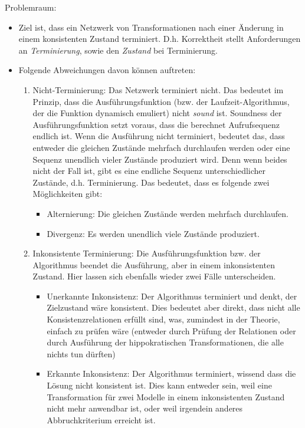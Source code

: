 Problemraum:
\begin{itemize}
    \item Ziel ist, dass ein Netzwerk von Transformationen nach einer Änderung in einem konsistenten Zustand terminiert. D.h. Korrektheit stellt Anforderungen an \emph{Terminierung}, sowie den \emph{Zustand} bei Terminierung.
    \item Folgende Abweichungen davon können auftreten:
    \begin{enumerate}
        \item Nicht-Terminierung: Das Netzwerk terminiert nicht. Das bedeutet im Prinzip, dass die Ausführungsfunktion (bzw. der Laufzeit-Algorithmus, der die Funktion dynamisch emuliert) nicht \emph{sound} ist. Soundness der Ausführungsfunktion setzt voraus, dass die berechnet Aufrufsequenz endlich ist. Wenn die Ausführung nicht terminiert, bedeutet das, dass entweder die gleichen Zustände mehrfach durchlaufen werden oder eine Sequenz unendlich vieler Zustände produziert wird. Denn wenn beides nicht der Fall ist, gibt es eine endliche Sequenz unterschiedlicher Zustände, d.h. Terminierung. Das bedeutet, dass es folgende zwei Möglichkeiten gibt:
        \begin{itemize}
            \item Alternierung: Die gleichen Zustände werden mehrfach durchlaufen.
            \item Divergenz: Es werden unendlich viele Zustände produziert.
        \end{itemize}
        \item Inkonsistente Terminierung: Die Ausführungsfunktion bzw. der Algorithmus beendet die Ausführung, aber in einem inkonsistenten Zustand. Hier lassen sich ebenfalls wieder zwei Fälle unterscheiden.
        \begin{itemize}
            \item Unerkannte Inkonsistenz: Der Algorithmus terminiert und denkt, der Zielzustand wäre konsistent. Dies bedeutet aber direkt, dass nicht alle Konsistenzrelationen erfüllt sind, was, zumindest in der Theorie, einfach zu prüfen wäre (entweder durch Prüfung der Relationen oder durch Ausführung der hippokratischen Transformationen, die alle nichts tun dürften)
            \item Erkannte Inkonsistenz: Der Algorithmus terminiert, wissend dass die Lösung nicht konsistent ist. Dies kann entweder sein, weil eine Transformation für zwei Modelle in einem inkonsistenten Zustand nicht mehr anwendbar ist, oder weil irgendein anderes Abbruchkriterium erreicht ist.
        \end{itemize}
    \end{enumerate}
\end{itemize}


